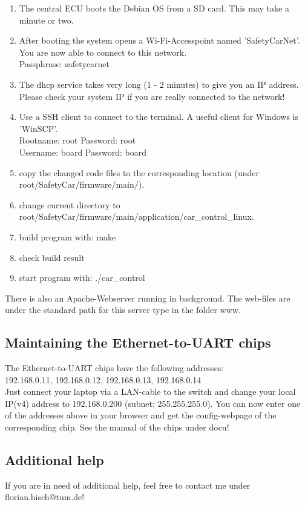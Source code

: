 \begin{enumerate}
\item The central ECU boots the Debian OS from a SD card. This may take a minute or two.
\item After booting the system opens a Wi-Fi-Accesspoint named 'SafetyCarNet'. You are now able to connect to this network.\\
Passphrase: safetycarnet
\item The dhcp service takes very long (1 - 2 minutes) to give you an IP address. Please check your system IP  if you are really connected to the network!
\item Use a SSH client to connect to the terminal. A useful client for Windows is 'WinSCP'.\\
Rootname: root \hspace{2em} Password: root\\
Username: board \hspace{2em} Password: board
\item copy the changed code files to the corresponding location (under root/SafetyCar/firmware/main/).
\item change current directory to root/SafetyCar/firmware/main/application/car\_control\_linux.
\item build program with: make
\item check build result
\item start program with: ./car\_control\\
\end{enumerate}
  
There is also an Apache-Webserver running in background. The web-files are under the standard path for this server type in the folder www.

\subsection{Maintaining the Ethernet-to-UART chips}

The Ethernet-to-UART chips have the following addresses:\\
192.168.0.11, 192.168.0.12, 192.168.0.13, 192.168.0.14\\

Just connect your laptop via a LAN-cable to the switch and change your local IP(v4) address to 192.168.0.200 (subnet: 255.255.255.0). You can now enter one of the addresses above in your browser and get the config-webpage of the corresponding chip. See the manual of the chips under docu!

\subsection{Additional help}

If you are in need of additional help, feel free to contact me under florian.hisch@tum.de!